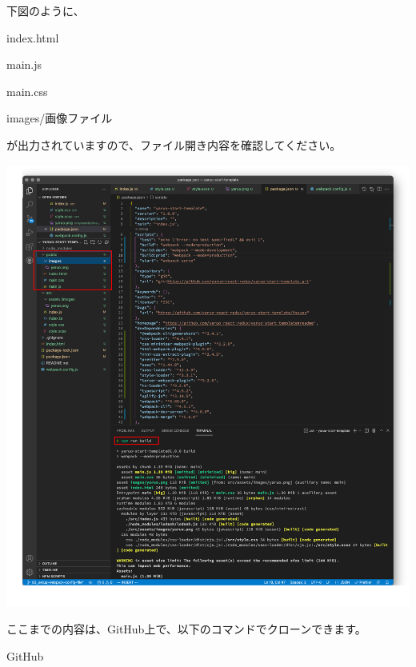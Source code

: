下図のように、\\[0pt]

\begin{starteritemize}
\item index.html
\item main.js
\item main.css
\item images/画像ファイル
\end{starteritemize}

が出力されていますので、ファイル開き内容を確認してください。

\begin{reviewimage}%
\includegraphics[width=1.0\maxwidth]{./images/02-create-react-app/webpack_test05.png}%
\label{image:02-create-react-app:webpack_test05}
\end{reviewimage}

\clearpage

\begin{starternote}[]{}

ここまでの内容は、GitHub上で、以下のコマンドでクローンできます。

\def\startercodeblockfontsize{}
\begin{starterterminal}[]{GitHub}\end{starterterminal}
\end{starternote}


